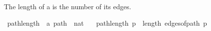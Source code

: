 \begin{isabellebody}
\begin{isamarkuptext}%
The length of a  is the number of its edges.%
\end{isamarkuptext}\isamarkuptrue%
\isamarkupfalse%
\ path{\isacharunderscore}{\kern0pt}length\ {\isacharcolon}{\kern0pt}{\isacharcolon}{\kern0pt}\ {\isachardoublequoteopen}{\isacharprime}{\kern0pt}a\ path\ {\isasymRightarrow}\ nat{\isachardoublequoteclose}\ \isanewline
\ \ {\isachardoublequoteopen}path{\isacharunderscore}{\kern0pt}length\ p\ {\isasymequiv}\ length\ {\isacharparenleft}{\kern0pt}edges{\isacharunderscore}{\kern0pt}of{\isacharunderscore}{\kern0pt}path\ p{\isacharparenright}{\kern0pt}{\isachardoublequoteclose}\isanewline
%
\isadelimtheory
\isanewline
%
\endisadelimtheory
%
\isatagtheory
{}\isamarkupfalse%
%
\endisatagtheory
{\isafoldtheory}%
%
\isadelimtheory
%
\endisadelimtheory
%
\end{isabellebody}%
\endinput
